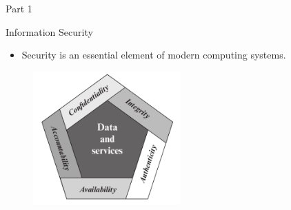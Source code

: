 \documentclass[handout]{beamer}
\begin{document}
\begin{frame}{}  

	\begin{block}{Part 1}
	\end{block}

\end{frame}


\begin{frame}{Information Security}

\begin{itemize}
\footnotesize

\item Security is an essential element of modern computing systems.




\end{itemize}



\begin{figure}
\includegraphics[width=160pt]{figures/security-requirements.png}
\end{figure}





\end{frame}
\end{document}
